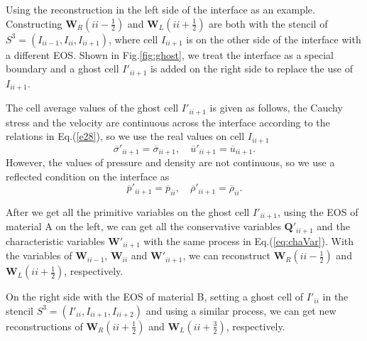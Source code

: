 \documentclass{article}
\numberwithin{equation}{section}
\numberwithin{table}{section}
\begin{document}
Using the reconstruction in the  left side of the interface as an example. Constructing $\bm{W}_R(ii-\frac{1}{2}) $ and $\bm{W}_L(ii+\frac{1}{2})$ are  both with the  stencil of  $S^3=(I_{ii-1},I_{ii}, I_{ii+1})$, where cell $I_{ii+1}$ is on the other side of the interface with a different EOS.
Shown in Fig.\ref{fig:ghost}, we treat the interface as a special boundary and a ghost cell $I'_{ii+1}$ is added on the right side to replace the use of $I_{ii+1}$. 

The cell average values of the ghost cell $I'_{ii+1}$ is given as follows, the Cauchy stress and the velocity  are  continuous across the interface according  to the relations in Eq.(\ref{e28}), so we use the real values on cell $I_{ii+1}$ 
\begin{equation}
  \overline{\sigma}'_{ii+1} = \overline{\sigma}_{ii+1}, \quad \overline{u}'_{ii+1} = \overline{u}_{ii+1}.
\end{equation}
However, the values of pressure and density are not continuous, so we use a reflected condition on the interface as
\begin{equation}
\overline{p}'_{ii+1} = \overline{p}_{ii}, \quad \overline{\rho}'_{ii+1} = \overline{\rho}_{ii}.
\end{equation}

After we get all the primitive variables on  the ghost cell $I'_{ii+1}$,   using  the EOS of material A on the left, we can get all the conservative variables  $\bm{Q}'_{ii+1}$ and the characteristic variables $\bm{W}'_{ii+1}$ with the same process in Eq.(\ref{eq:chaVar}). With the variables of $\bm{W}_{ii-1}$, $\bm{W}_{ii}$ and  $\bm{W}'_{ii+1}$, we can reconstruct $\bm{W}_R(ii-\frac{1}{2})$ and $\bm{W}_L(ii+\frac{1}{2})$, respectively.

On the right side with the EOS of material B, setting a ghost cell of $I'_{ii}$ in the stencil $S^3 = (I'_{ii}, I_{ii+1}, I_{ii+2})$ and using a similar process, we can get new reconstructions of $\bm{W}_R(ii+\frac{1}{2})$ and  $\bm{W}_L(ii+\frac{3}{2})$, respectively.
\end{document}

